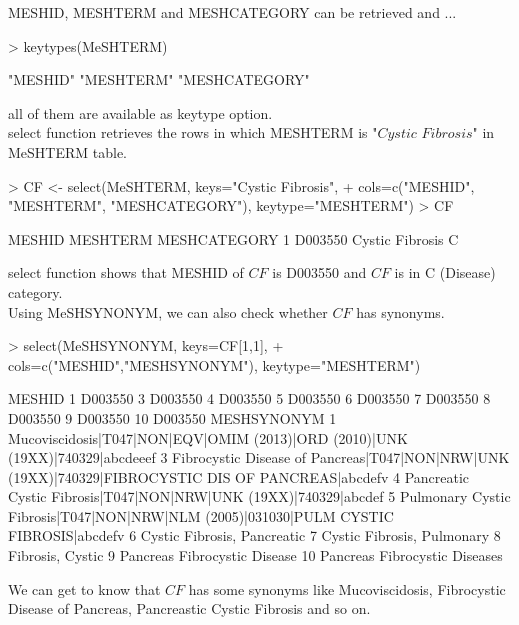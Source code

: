 \documentclass[11pt]{article}
\begin{document}
MESHID, MESHTERM and MESHCATEGORY can be retrieved and ...
\begin{center}
\begin{Schunk}
\begin{Sinput}
> keytypes(MeSHTERM)
\end{Sinput}
\begin{Soutput}
[1] "MESHID"       "MESHTERM"     "MESHCATEGORY"
\end{Soutput}
\end{Schunk}
\end{center}
all of them are available as keytype option.\\


select function retrieves the rows in which MESHTERM is "$Cystic$ $Fibrosis$" in MeSHTERM table.
\begin{center}
\begin{Schunk}
\begin{Sinput}
> CF <- select(MeSHTERM, keys="Cystic Fibrosis",
+             cols=c("MESHID", "MESHTERM", "MESHCATEGORY"), keytype="MESHTERM")
> CF
\end{Sinput}
\begin{Soutput}
   MESHID        MESHTERM MESHCATEGORY
1 D003550 Cystic Fibrosis            C
\end{Soutput}
\end{Schunk}
\end{center}


select function shows that MESHID of $CF$ is D003550 and $CF$ is in C (Disease) category.\\


Using MeSHSYNONYM, we can also check whether $CF$ has synonyms.
\begin{center}
\begin{Schunk}
\begin{Sinput}
> select(MeSHSYNONYM, keys=CF[1,1],
+        cols=c("MESHID","MESHSYNONYM"), keytype="MESHTERM")
\end{Sinput}
\end{Schunk}
\end{center}
\begin{center}
\begin{Schunk}
\begin{Soutput}
MESHID
1 D003550
3 D003550
4 D003550
5 D003550
6 D003550
7 D003550
8 D003550
9 D003550
10 D003550
MESHSYNONYM
1 Mucoviscidosis|T047|NON|EQV|OMIM (2013)|ORD (2010)|UNK
(19XX)|740329|abcdeeef
3 Fibrocystic Disease of Pancreas|T047|NON|NRW|UNK
(19XX)|740329|FIBROCYSTIC DIS OF PANCREAS|abcdefv
4 Pancreatic Cystic Fibrosis|T047|NON|NRW|UNK (19XX)|740329|abcdef
5 Pulmonary Cystic Fibrosis|T047|NON|NRW|NLM (2005)|031030|PULM CYSTIC
FIBROSIS|abcdefv
6 Cystic Fibrosis, Pancreatic
7 Cystic Fibrosis, Pulmonary
8 Fibrosis, Cystic
9 Pancreas Fibrocystic Disease
10 Pancreas Fibrocystic Diseases
\end{Soutput}
\end{Schunk}
\end{center}
We can get to know that $CF$ has some synonyms like Mucoviscidosis, Fibrocystic Disease of Pancreas, Pancreastic Cystic Fibrosis and so on.\\\\
\end{document}
